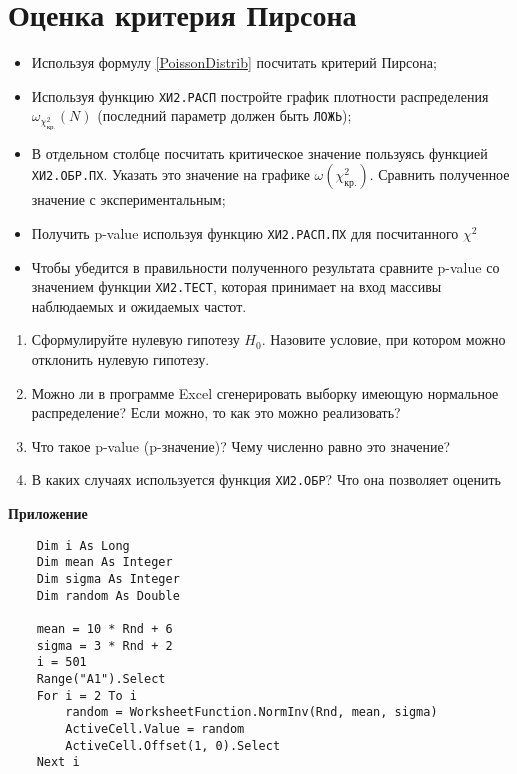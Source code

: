 \documentclass[14pt,a4paper]{article}
\begin{document}
\section{Оценка критерия Пирсона}
\begin{itemize}
	\item Используя формулу \ref{PoissonDistrib} посчитать критерий Пирсона;
	\item Используя функцию \texttt{ХИ2.РАСП} постройте график плотности распределения $\omega_{\chi_\text{кр.}^2}(N)$ (последний параметр должен быть \verb=ЛОЖЬ=);
	\item В отдельном столбце посчитать критическое значение пользуясь функцией \texttt{ХИ2.ОБР.ПХ}. Указать это значение на графике $\omega(\chi_\text{кр.}^2)$. Сравнить полученное значение с экспериментальным;
	\item Получить p-value используя функцию \texttt{ХИ2.РАСП.ПХ} для посчитанного $\chi^2$
	\item Чтобы убедится в правильности полученного результата сравните p-value со значением функции \texttt{ХИ2.ТЕСТ}, которая принимает на вход массивы наблюдаемых и ожидаемых частот.    
\end{itemize}

\questions{}
\begin{enumerate}
	\item Сформулируйте нулевую гипотезу $H_0$. Назовите условие, при котором можно отклонить нулевую гипотезу.
	\item Можно ли в программе Excel сгенерировать выборку имеющую нормальное распределение? Если можно, то как это можно реализовать? %
	\item Что такое p-value (p-значение)? Чему численно равно это значение?
	\item В каких случаях используется функция \texttt{ХИ2.ОБР}? Что она позволяет оценить
\end{enumerate}
\begin{center}
	\textbf{\Large Приложение}
\end{center}
	\renewcommand{\lstlistingname}{Листинг}
\begin{lstlisting}
	Dim i As Long
	Dim mean As Integer
	Dim sigma As Integer
	Dim random As Double

	mean = 10 * Rnd + 6
	sigma = 3 * Rnd + 2
	i = 501
	Range("A1").Select
	For i = 2 To i
		random = WorksheetFunction.NormInv(Rnd, mean, sigma)
		ActiveCell.Value = random
		ActiveCell.Offset(1, 0).Select
	Next i
	\end{lstlisting}
\end{document}
